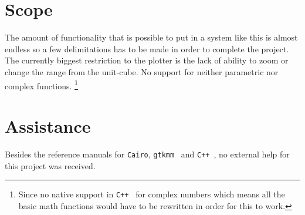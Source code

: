 \documentclass[a4paper,11pt]{kth-mag}
\newcommand{\Cpp}{\texttt{C++}}
\newcommand{\Gtkmm}{\texttt{gtkmm}}
\newcommand{\Cairo}{\texttt{Cairo}}
\begin{document}
\section{Scope}
\label{sec:scope}
The amount of functionality that is possible to put in a system like this is
almost endless so a few delimitations has to be made in order to complete the project.
The currently biggest restriction to the plotter is the lack of 
ability to zoom or change the range from the unit-cube.
No support for neither parametric nor complex functions.
\footnote{
    Since no native support in \Cpp~ for complex numbers which means 
    all the basic math functions would have to be rewritten in order for this to work.
}

\section{Assistance}
Besides the reference manuals for \Cairo, \Gtkmm~ and \Cpp~, no external help for 
this project was received.
\end{document}
